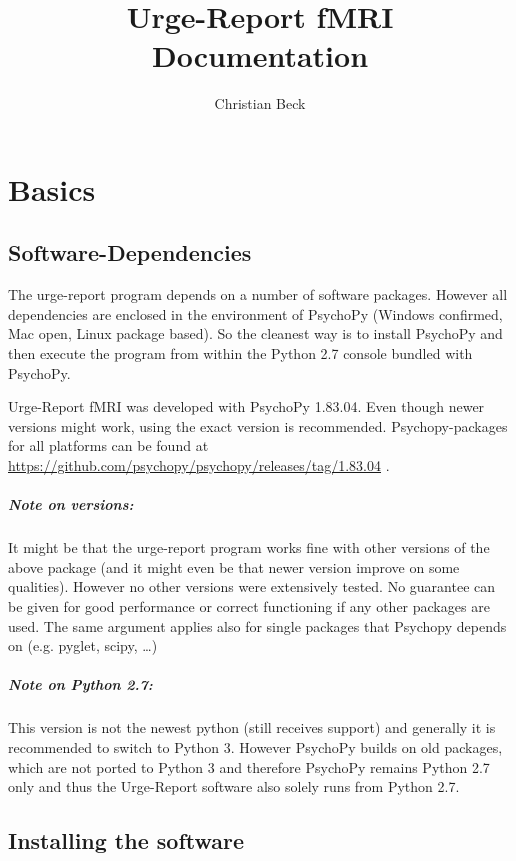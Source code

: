 \documentclass[12pt,a4paper]{book}
\title{Urge-Report fMRI\\Documentation}
\author{Christian Beck}
\begin{document}
\maketitle

\tableofcontents

\chapter{Basics}

\section{Software-Dependencies}

The urge-report program depends on a number of software packages. However all dependencies are enclosed in the environment of PsychoPy (Windows confirmed, Mac open, Linux package based). So the cleanest way is to install PsychoPy and then execute the program from within the Python 2.7 console bundled with PsychoPy.

Urge-Report fMRI was developed with PsychoPy 1.83.04. Even though newer versions might work, using the exact version is recommended. Psychopy-packages for all platforms can be found at \url{https://github.com/psychopy/psychopy/releases/tag/1.83.04} .

\paragraph{Note on versions:} It might be that the urge-report program works fine with other versions of the above package (and it might even be that newer version improve on some qualities). However no other versions were extensively tested. No guarantee can be given for good performance or correct functioning if any other packages are used. The same argument applies also for single packages that Psychopy depends on (e.g. pyglet, scipy, \dots)

\paragraph{Note on Python 2.7:} This version is not the newest python (still receives support) and generally it is recommended to switch to Python 3. However PsychoPy builds on old packages, which are not ported to Python 3 and therefore PsychoPy remains Python 2.7 only and thus the Urge-Report software also solely runs from Python 2.7.

\section{Installing the software}
\end{document}
